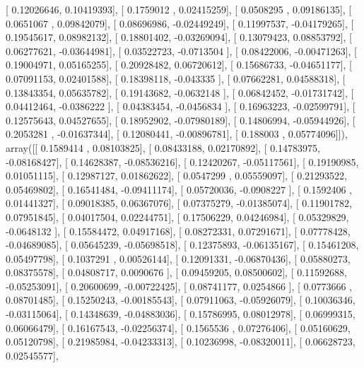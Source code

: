 \documentclass{article}
\begin{document}
       [ 0.12026646,  0.10419393],
       [ 0.1759012 ,  0.02415259],
       [ 0.0508295 ,  0.09186135],
       [ 0.0651067 ,  0.09842079],
       [ 0.08696986, -0.02449249],
       [ 0.11997537, -0.04179265],
       [ 0.19545617,  0.08982132],
       [ 0.18801402, -0.03269094],
       [ 0.13079423,  0.08853792],
       [ 0.06277621, -0.03644981],
       [ 0.03522723, -0.0713504 ],
       [ 0.08422006, -0.00471263],
       [ 0.19004971,  0.05165255],
       [ 0.20928482,  0.06720612],
       [ 0.15686733, -0.04651177],
       [ 0.07091153,  0.02401588],
       [ 0.18398118, -0.043335  ],
       [ 0.07662281,  0.04588318],
       [ 0.13843354,  0.05635782],
       [ 0.19143682, -0.0632148 ],
       [ 0.06842452, -0.01731742],
       [ 0.04412464, -0.0386222 ],
       [ 0.04383454, -0.0456834 ],
       [ 0.16963223, -0.02599791],
       [ 0.12575643,  0.04527655],
       [ 0.18952902, -0.07980189],
       [ 0.14806994, -0.05944926],
       [ 0.2053281 , -0.01637344],
       [ 0.12080441, -0.00896781],
       [ 0.188003  ,  0.05774096]]), array([[ 0.1589414 ,  0.08103825],
       [ 0.08433188,  0.02170892],
       [ 0.14783975, -0.08168427],
       [ 0.14628387, -0.08536216],
       [ 0.12420267, -0.05117561],
       [ 0.19190985,  0.01051115],
       [ 0.12987127,  0.01862622],
       [ 0.0547299 ,  0.05559097],
       [ 0.21293522,  0.05469802],
       [ 0.16541484, -0.09411174],
       [ 0.05720036, -0.0908227 ],
       [ 0.1592406 ,  0.01441327],
       [ 0.09018385,  0.06367076],
       [ 0.07375279, -0.01385074],
       [ 0.11901782,  0.07951845],
       [ 0.04017504,  0.02244751],
       [ 0.17506229,  0.04246984],
       [ 0.05329829, -0.0648132 ],
       [ 0.15584472,  0.04917168],
       [ 0.08272331,  0.07291671],
       [ 0.07778428, -0.04689085],
       [ 0.05645239, -0.05698518],
       [ 0.12375893, -0.06135167],
       [ 0.15461208,  0.05497798],
       [ 0.1037291 ,  0.00526144],
       [ 0.12091331, -0.06870436],
       [ 0.05880273,  0.08375578],
       [ 0.04808717,  0.0090676 ],
       [ 0.09459205,  0.08500602],
       [ 0.11592688, -0.05253091],
       [ 0.20600699, -0.00722425],
       [ 0.08741177,  0.0254866 ],
       [ 0.0773666 ,  0.08701485],
       [ 0.15250243, -0.00185543],
       [ 0.07911063, -0.05926079],
       [ 0.10036346, -0.03115064],
       [ 0.14348639, -0.04883036],
       [ 0.15786995,  0.08012978],
       [ 0.06999315,  0.06066479],
       [ 0.16167543, -0.02256374],
       [ 0.1565536 ,  0.07276406],
       [ 0.05160629,  0.05120798],
       [ 0.21985984, -0.04233313],
       [ 0.10236998, -0.08320011],
       [ 0.06628723,  0.02545577],
\end{document}
